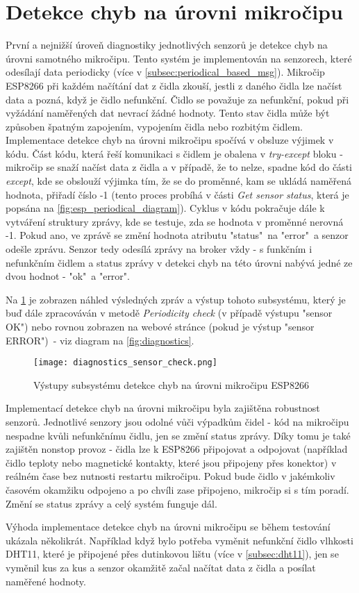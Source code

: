 \section{Detekce chyb na úrovni mikročipu} \label{sec:error_detection_esp}
První a nejnižší úroveň diagnostiky jednotlivých senzorů je detekce chyb na úrovni samotného mikročipu. Tento systém je implementován na senzorech, které odesílají data periodicky (více v \cref{subsec:periodical_based_msg}). Mikročip ESP8266 při každém načítání dat z čidla zkouší, jestli z daného čidla lze načíst data a pozná, když je čidlo nefunkční. Čidlo se považuje za nefunkční, pokud při vyžádání naměřených dat nevrací žádné hodnoty. Tento stav čidla může být způsoben špatným zapojením, vypojením čidla nebo rozbitým čidlem. Implementace detekce chyb na úrovni mikročipu spočívá v obsluze výjimek v kódu. Část kódu, která řeší komunikaci s čidlem je obalena v \textit{try-except} bloku - mikročip se snaží načíst data z čidla a v případě, že to nelze, spadne kód do části \textit{except}, kde se obslouží výjimka tím, že se do proměnné, kam se ukládá naměřená hodnota, přiřadí číslo -1 (tento proces probíhá v části \textit{Get sensor status}, která je popsána na \cref{fig:esp_periodical_diagram}). Cyklus v kódu pokračuje dále k vytváření struktury zprávy, kde se testuje, zda se hodnota v proměnné nerovná -1. Pokud ano, ve zprávě se změní hodnota atributu "status"\ na "error"\ a senzor odešle zprávu. Senzor tedy odesílá zprávy na broker vždy - s funkčním i nefunkčním čidlem a status zprávy v detekci chyb na této úrovni nabývá jedné ze dvou hodnot - "ok"\ a "error".\par
Na \cref{fig:diagnostics_sensor_check} je zobrazen náhled výsledných zpráv a výstup tohoto subsystému, který je buď dále zpracováván v metodě \textit{Periodicity check} (v případě výstupu "sensor OK") nebo rovnou zobrazen na webové stránce (pokud je výstup "sensor ERROR")\ - viz diagram na \cref{fig:diagnostics}. 

\begin{figure}[H]
  \centering
  \texttt{[image: diagnostics\_sensor\_check.png]}
  \caption{Výstupy subsystému detekce chyb na úrovni mikročipu ESP8266}
  \label{fig:diagnostics_sensor_check}
\end{figure} 

Implementací detekce chyb na úrovni mikročipu byla zajištěna robustnost senzorů. Jednotlivé senzory jsou odolné vůči výpadkům čidel - kód na mikročipu nespadne kvůli nefunkčnímu čidlu, jen se změní status zprávy. Díky tomu je také zajištěn nonstop provoz - čidla lze k ESP8266 připojovat a odpojovat (například čidlo teploty nebo magnetické kontakty, které jsou připojeny přes konektor) v reálném čase bez nutnosti restartu mikročipu. Pokud bude čidlo v jakémkoliv časovém okamžiku odpojeno a po chvíli zase připojeno, mikročip si s tím poradí. Změní se status zprávy a celý systém funguje dál. \par
Výhoda implementace detekce chyb na úrovni mikročipu se během testování ukázala několikrát. Například když bylo potřeba vyměnit nefunkční čidlo vlhkosti DHT11, které je připojené přes dutinkovou lištu (více v \cref{subsec:dht11}), jen se vyměnil kus za kus a senzor okamžitě začal načítat data z čidla a posílat naměřené hodnoty.


